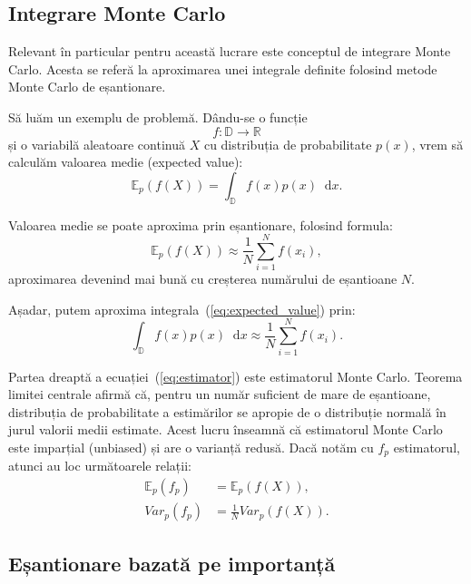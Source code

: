 \documentclass[12pt,a4paper]{report}
\newcommand*\diff{\mathop{}\!\mathrm{d}}
\numberwithin{equation}{section} %
\begin{document}
\subsection{Integrare Monte Carlo}

Relevant în particular pentru această lucrare este conceptul de integrare Monte Carlo.
Acesta se referă la aproximarea unei integrale definite folosind metode Monte Carlo
de eșantionare.

Să luăm un exemplu de problemă. Dându-se o funcție $$f: \mathbb{D} \to \mathbb{R}$$
și o variabilă aleatoare continuă $X$ cu distribuția de probabilitate $p(x)$, vrem să calculăm
valoarea medie (expected value):
\begin{equation}\label{eq:expected_value}
	\mathbb{E}_p(f(X)) = \int_{\mathbb{D}} f(x) p(x)\diff x.
\end{equation}

Valoarea medie se poate aproxima prin eșantionare, folosind formula:
\begin{equation}
	\mathbb{E}_p(f(X)) \approx \frac{1}{N} \sum_{i=1}^{N} f(x_i),
\end{equation}
aproximarea devenind mai bună cu creșterea numărului de eșantioane $N$.

Așadar, putem aproxima integrala~(\ref{eq:expected_value}) prin:
\begin{equation}\label{eq:estimator}
	\int_{\mathbb{D}} f(x) p(x)\diff x \approx \frac{1}{N} \sum_{i=1}^{N} f(x_i).
\end{equation}

Partea dreaptă a ecuației~(\ref{eq:estimator}) este estimatorul Monte Carlo.
Teorema limitei centrale afirmă că, pentru un număr suficient de mare de eșantioane,
distribuția de probabilitate a estimărilor se apropie de o distribuție normală în
jurul valorii medii estimate. Acest lucru înseamnă că estimatorul Monte
Carlo este imparțial (unbiased) și are o varianță redusă. Dacă notăm cu $f_p$
estimatorul, atunci au loc următoarele relații:
\begin{equation}
	\begin{aligned}
		\mathbb{E}_p(f_p) & = \mathbb{E}_p(f(X)),     \\
		Var_p(f_p)        & = \frac{1}{N}Var_p(f(X)).
	\end{aligned}
\end{equation}

\subsection{Eșantionare bazată pe importanță}\label{sec:is}
\end{document}
